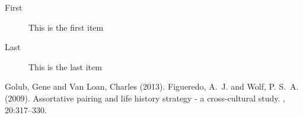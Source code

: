 \documentclass[DIV=calc, paper=a4, fontsize=10pt, twocolumn]{scrartcl}	 %
\begin{document}
\begin{description}
\item[First] This is the first item
\item[Last] This is the last item
\end{description}

\lipsum[9] %


\begin{thebibliography}{99} %

Golub, Gene and Van Loan, Charles (2013). 
Figueredo, A.~J. and Wolf, P. S.~A. (2009).
\newblock Assortative pairing and life history strategy - a cross-cultural
  study.
, 20:317--330.
  
 
\end{thebibliography}

\end{document}
